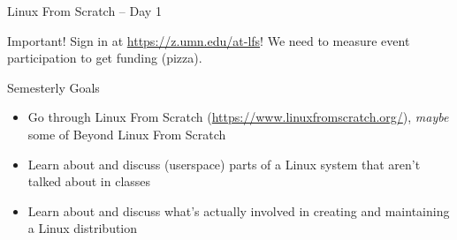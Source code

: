 \documentclass[aspectratio=169]{beamer}
\date{February 5, 2025}
\begin{document}
\begin{frame}{Linux From Scratch -- Day 1}
	\small
	\begin{alertblock}{Important!}
		\vspace{0.5em}
		Sign in at \url{https://z.umn.edu/at-lfs}!
		We need to measure event participation to get funding (pizza).
		\vspace{0.5em}
	\end{alertblock}
	\vspace{0.5em}
	\begin{block}{Semesterly Goals}
		\vspace{0.5em}
		\begin{itemize}
			\item Go through Linux From Scratch (\url{https://www.linuxfromscratch.org/}), \textit{maybe} some of Beyond Linux From Scratch
			\item Learn about and discuss (userspace) parts of a Linux system that aren't talked about in classes
			\item Learn about and discuss what's actually involved in creating and maintaining a Linux distribution
		\end{itemize}
		\vspace{0.5em}
	\end{block}
\end{frame}
\end{document}
